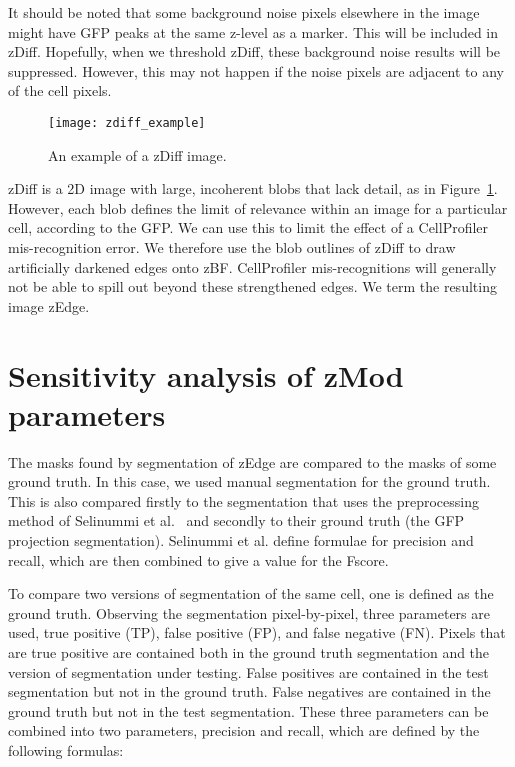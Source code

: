 It should be noted that some background noise pixels elsewhere in the image might have GFP peaks at the same z-level as a marker. This will be included in zDiff. Hopefully, when we threshold zDiff, these background noise results will be suppressed. However, this may not happen if the noise pixels are adjacent to any of the cell pixels.

\begin{figure}[htbp!]
\centering
\texttt{[image: zdiff\_example]}
\caption[zDiff image sample]{An example of a zDiff image.}
\label{fig:zdiff}
\end{figure}

zDiff is a 2D image with large, incoherent blobs that lack detail, as in Figure~\ref{fig:zdiff}. However, each blob defines the limit of relevance within an image for a particular cell, according to the GFP. We can use this to limit the effect of a CellProfiler mis-recognition error. We therefore use the blob outlines of zDiff to draw artificially darkened edges onto zBF. CellProfiler mis-recognitions will generally not be able to spill out beyond these strengthened edges. We term the resulting image zEdge.

\section{Sensitivity analysis of zMod parameters}

The masks found by segmentation of zEdge are compared to the masks of some ground truth. In this case, we used manual segmentation for the ground truth. This is also compared firstly to the segmentation that uses the preprocessing method of Selinummi et al.~\cite{selinummi} and secondly to their ground truth (the GFP projection segmentation). Selinummi et al. define formulae for precision and recall, which are then combined to give a value for the Fscore.

To compare two versions of segmentation of the same cell, one is defined as the ground truth. Observing the segmentation pixel-by-pixel, three parameters are used, true positive (TP), false positive (FP), and false negative (FN). Pixels that are true positive are contained both in the ground truth segmentation and the version of segmentation under testing. False positives are contained in the test segmentation but not in the ground truth. False negatives are contained in the ground truth but not in the test segmentation. These three parameters can be combined into two parameters, precision and recall, which are defined by the following formulas:

